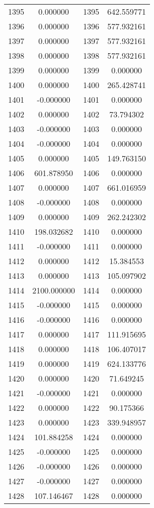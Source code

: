 \documentclass[12pt]{article}
\begin{document}
\begin{longtable}{@{}cccc@{}}
1395 & 0.000000 & 1395 & 642.559771 \\
1396 & 0.000000 & 1396 & 577.932161 \\
1397 & 0.000000 & 1397 & 577.932161 \\
1398 & 0.000000 & 1398 & 577.932161 \\
1399 & 0.000000 & 1399 & 0.000000 \\
1400 & 0.000000 & 1400 & 265.428741 \\
1401 & -0.000000 & 1401 & 0.000000 \\
1402 & 0.000000 & 1402 & 73.794302 \\
1403 & -0.000000 & 1403 & 0.000000 \\
1404 & -0.000000 & 1404 & 0.000000 \\
1405 & 0.000000 & 1405 & 149.763150 \\
1406 & 601.878950 & 1406 & 0.000000 \\
1407 & 0.000000 & 1407 & 661.016959 \\
1408 & -0.000000 & 1408 & 0.000000 \\
1409 & 0.000000 & 1409 & 262.242302 \\
1410 & 198.032682 & 1410 & 0.000000 \\
1411 & -0.000000 & 1411 & 0.000000 \\
1412 & 0.000000 & 1412 & 15.384553 \\
1413 & 0.000000 & 1413 & 105.097902 \\
1414 & 2100.000000 & 1414 & 0.000000 \\
1415 & -0.000000 & 1415 & 0.000000 \\
1416 & -0.000000 & 1416 & 0.000000 \\
1417 & 0.000000 & 1417 & 111.915695 \\
1418 & 0.000000 & 1418 & 106.407017 \\
1419 & 0.000000 & 1419 & 624.133776 \\
1420 & 0.000000 & 1420 & 71.649245 \\
1421 & -0.000000 & 1421 & 0.000000 \\
1422 & 0.000000 & 1422 & 90.175366 \\
1423 & 0.000000 & 1423 & 339.948957 \\
1424 & 101.884258 & 1424 & 0.000000 \\
1425 & -0.000000 & 1425 & 0.000000 \\
1426 & -0.000000 & 1426 & 0.000000 \\
1427 & -0.000000 & 1427 & 0.000000 \\
1428 & 107.146467 & 1428 & 0.000000 \\

\end{longtable}
\end{document}
